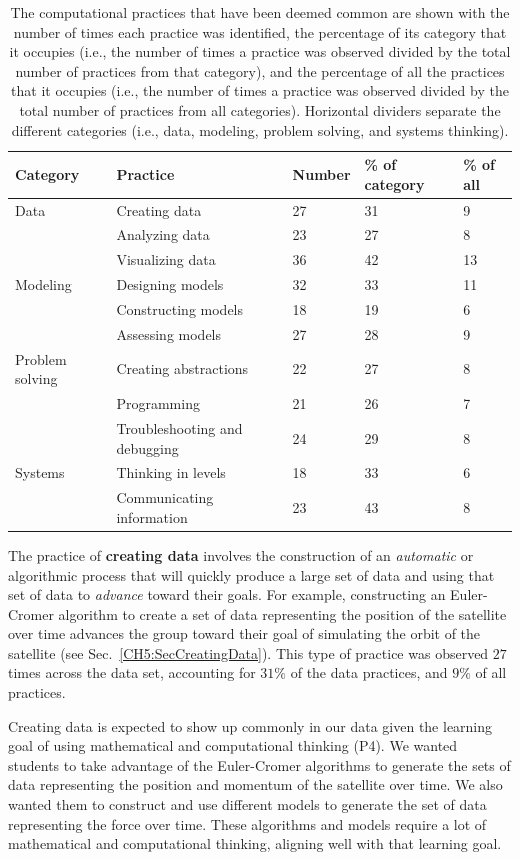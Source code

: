 \documentclass{msuphddissertation}
\begin{document}
\begin{doublespace}
\begin{table}[hb]\centering
\begin{tabular}{lllll}\hline\hline
Category & Practice & Number & \% of category & \% of all\\\hline
Data & Creating data & 27 & 31 & 9 \\
 & Analyzing data & 23 & 27 & 8 \\
 & Visualizing data & 36 & 42 & 13 \\\hline
Modeling & Designing models & 32 & 33 & 11 \\
 & Constructing models & 18 & 19 & 6 \\
 & Assessing models & 27 & 28 & 9\\\hline
Problem solving & Creating abstractions & 22 & 27 & 8 \\
 & Programming & 21 & 26 & 7 \\
 & Troubleshooting and debugging & 24 & 29 & 8 \\\hline
Systems & Thinking in levels & 18 & 33 & 6 \\
 & Communicating information & 23 & 43 & 8 \\\hline\hline
\end{tabular}
\caption{The computational practices that have been deemed common are shown with the number of times each practice was identified, the percentage of its category that it occupies (i.e., the number of times a practice was observed divided by the total number of practices from that category), and the percentage of all the practices that it occupies (i.e., the number of times a practice was observed divided by the total number of practices from all categories).  Horizontal dividers separate the different categories (i.e., data, modeling, problem solving, and systems thinking).}\label{CH6:Common}
\end{table}

The practice of \textbf{creating data} involves the construction of an \textit{automatic} or algorithmic process that will quickly produce a large set of data and using that set of data to \textit{advance} toward their goals.  For example, constructing an Euler-Cromer algorithm to create a set of data representing the position of the satellite over time advances the group toward their goal of simulating the orbit of the satellite (see Sec.~\ref{CH5:SecCreatingData}).  This type of practice was observed $27$ times across the data set, accounting for $31\%$ of the data practices, and $9\%$ of all practices.

Creating data is expected to show up commonly in our data given the learning goal of using mathematical and computational thinking (P4).  We wanted students to take advantage of the Euler-Cromer algorithms to generate the sets of data representing the position and momentum of the satellite over time.  We also wanted them to construct and use different models to generate the set of data representing the force over time.  These algorithms and models require a lot of mathematical and computational thinking, aligning well with that learning goal.


\end{doublespace}
\end{document}
